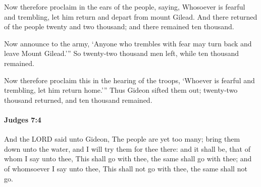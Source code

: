 			\begin{versebox}
					\item[BHS] 
					\item[ASV] Now therefore proclaim in the ears of the people, saying, Whosoever is fearful and trembling, let him return and depart from mount Gilead. And there returned of the people twenty and two thousand; and there remained ten thousand.
					\item[NIV] Now announce to the army, ‘Anyone who trembles with fear may turn back and leave Mount Gilead.’” So twenty-two thousand men left, while ten thousand remained.
					\item[NRSV] Now therefore proclaim this in the hearing of the troops, ‘Whoever is fearful and trembling, let him return home.’” Thus Gideon sifted them out; twenty-two thousand returned, and ten thousand remained.
			\end{versebox}

		\paragraph{Judges 7:4} %
			\label{JUDGES-7-4}

			And the LORD said unto Gideon, The people are yet too many; bring them down unto the water, and I will try them for thee there: and it shall be, that of whom I say unto thee, This shall go with thee, the same shall go with thee; and of whomsoever I say unto thee, This shall not go with thee, the same shall not go.

